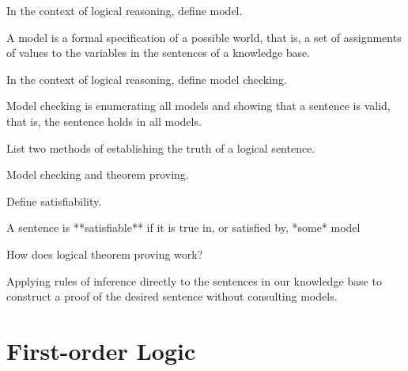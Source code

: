 \begin{questions}

\question In the context of logical reasoning, define model.

\begin{solution}[.75in]
A model is a formal specification of a possible world, that is, a set of assignments of values to the variables in the sentences of a knowledge base.
\end{solution}


\question In the context of logical reasoning, define model checking.

\begin{solution}[.75in]
Model checking is enumerating all models and showing that a sentence is valid, that is, the sentence holds in all models.
\end{solution}

\question List two methods of establishing the truth of a logical sentence.

\begin{solution}[.5in]
Model checking and theorem proving.
\end{solution}

\question Define satisfiability.

\begin{solution}[.5in]
A sentence is **satisfiable** if it is true in, or satisfied by, *some* model
\end{solution}

\question How does logical theorem proving work?

\begin{solution}[.75in]
Applying rules of inference directly to the sentences in our knowledge base to construct a proof of the desired sentence without consulting models.
\end{solution}

\end{questions}

\vspace{-.2in}

\section{First-order Logic}

